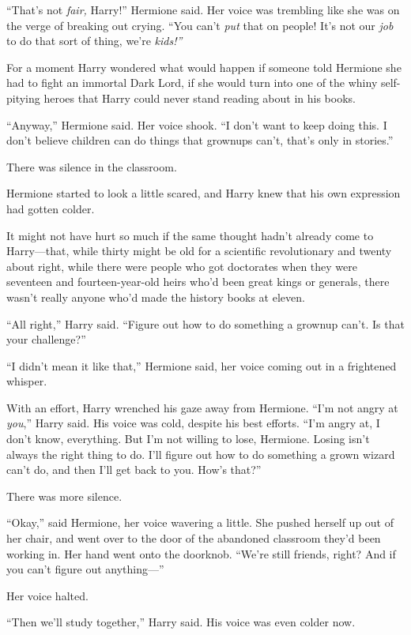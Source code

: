 ``That's not \emph{fair,} Harry!'' Hermione said. Her voice was
trembling like she was on the verge of breaking out crying. ``You can't
\emph{put} that on people! It's not our \emph{job} to do that sort of
thing, we're \emph{kids!''}

For a moment Harry wondered what would happen if someone told Hermione
she had to fight an immortal Dark Lord, if she would turn into one of
the whiny self-pitying heroes that Harry could never stand reading about
in his books.

``Anyway,'' Hermione said. Her voice shook. ``I don't want to keep doing
this. I don't believe children can do things that grownups can't, that's
only in stories.''

There was silence in the classroom.

Hermione started to look a little scared, and Harry knew that his own
expression had gotten colder.

It might not have hurt so much if the same thought hadn't already come
to Harry---that, while thirty might be old for a scientific
revolutionary and twenty about right, while there were people who got
doctorates when they were seventeen and fourteen-year-old heirs who'd
been great kings or generals, there wasn't really anyone who'd made the
history books at eleven.

``All right,'' Harry said. ``Figure out how to do something a grownup
can't. Is that your challenge?''

``I didn't mean it like that,'' Hermione said, her voice coming out in a
frightened whisper.

With an effort, Harry wrenched his gaze away from Hermione. ``I'm not
angry at \emph{you},'' Harry said. His voice was cold, despite his best
efforts. ``I'm angry at, I don't know, everything. But I'm not willing
to lose, Hermione. Losing isn't always the right thing to do. I'll
figure out how to do something a grown wizard can't do, and then I'll
get back to you. How's that?''

There was more silence.

``Okay,'' said Hermione, her voice wavering a little. She pushed herself
up out of her chair, and went over to the door of the abandoned
classroom they'd been working in. Her hand went onto the doorknob.
``We're still friends, right? And if you can't figure out anything---''

Her voice halted.

``Then we'll study together,'' Harry said. His voice was even colder
now.

